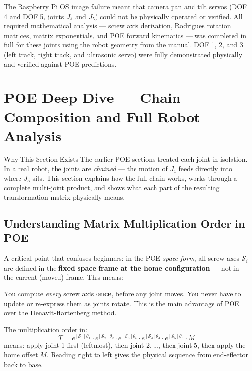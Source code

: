 \documentclass[12pt,a4paper]{article}
\begin{document}
\vspace{8pt}
The Raspberry Pi OS image failure meant that camera pan and tilt servos (DOF 4
and DOF 5, joints $J_4$ and $J_5$) could not be physically operated or verified.
All required mathematical analysis --- screw axis derivation, Rodrigues rotation
matrices, matrix exponentials, and POE forward kinematics --- was completed in
full for these joints using the robot geometry from the manual. DOF 1, 2, and 3
(left track, right track, and ultrasonic servo) were fully demonstrated physically
and verified against POE predictions.

\newpage
\appendix
\section{POE Deep Dive --- Chain Composition and Full Robot Analysis}

\begin{conceptbox}{Why This Section Exists}
The earlier POE sections treated each joint in isolation. In a real robot, the
joints are \emph{chained} --- the motion of $J_4$ feeds directly into where
$J_5$ sits. This section explains how the full chain works, works through a
complete multi-joint product, and shows what each part of the resulting
transformation matrix physically means.
\end{conceptbox}

\subsection{Understanding Matrix Multiplication Order in POE}

A critical point that confuses beginners: in the POE \emph{space form}, all
screw axes $\mathcal{S}_i$ are defined in the \textbf{fixed space frame at the
home configuration} --- not in the current (moved) frame. This means:

\begin{resultbox}
\centering
You compute \emph{every} screw axis \textbf{once}, before any joint moves.
You never have to update or re-express them as joints rotate.
This is the main advantage of POE over the Denavit-Hartenberg method.
\end{resultbox}

\vspace{6pt}

The multiplication order in:
\[
  T = e^{[\mathcal{S}_1]\theta_1}
    \cdot e^{[\mathcal{S}_2]\theta_2}
    \cdot e^{[\mathcal{S}_3]\theta_3}
    \cdot e^{[\mathcal{S}_4]\theta_4}
    \cdot e^{[\mathcal{S}_5]\theta_5}
    \cdot M
\]
means: apply joint 1 first (leftmost), then joint 2, \ldots, then joint 5, then
apply the home offset $M$. Reading right to left gives the physical sequence
from end-effector back to base.
\end{document}
